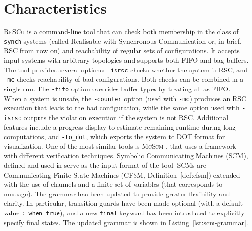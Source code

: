 \section{Characteristics}
\textsc{ReSCu} is a command-line tool that can check both membership in the 
class of \verb|synch| systems (called Realisable with Synchronous Communication 
or, in brief, RSC from now on) and reachability of regular sets of configurations. It 
accepts input systems with arbitrary topologies and supports both FIFO and 
bag buffers. The tool provides several options: 
\verb|-isrsc| checks whether the system is RSC, and \verb|-mc| checks reachability of 
bad configurations. Both checks can be combined in a single run. The \verb|-fifo| option 
overrides buffer types by treating all as FIFO. When a system is unsafe, the 
\verb|-counter| option (used with \verb|-mc|) produces an RSC execution that leads 
to the bad configuration, while the same option used with \verb|-isrsc| outputs the %
violation execution if the system is not RSC. Additional features include 
a progress display to estimate remaining runtime during long computations, and 
\verb|-to_dot|, which exports the system to DOT format for visualization.
One of the most similar tools is \textsc{McScm} \cite{heussner2012mcscm}, that
uses a framework with different verification techniques. 
Symbolic Communicating Machines (SCM), defined and used in \cite[Definition 5.1]{le2008abstract}
serve as the input format of the tool. SCMs are Communicating 
Finite-State Machines (CFSM, Definition~\ref{def:cfsm}) 
extended with the use of channels and a finite set of variables (that 
corresponds to message).
The grammar has been updated to provide greater flexibility and clarity. In
particular, transition guards have been made optional (with a default value
\verb|: when true|), and a new \verb|final| keyword has been introduced to
explicitly specify final states. The updated grammar is shown in
Listing~\ref{lst:scm-grammar}. 

